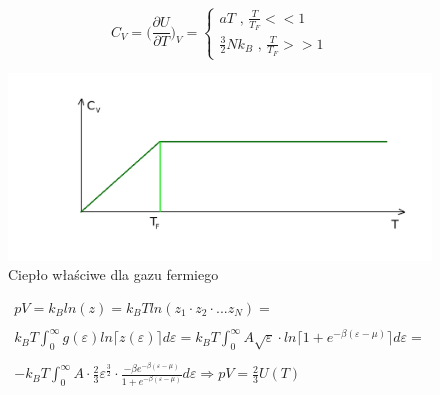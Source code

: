 \documentclass{article}
\begin{document}
		\begin{equation}
		C_V = \bigg( \frac{\partial U}{\partial T} \bigg)_V = 
		\begin{cases}
			aT \text{ , } \frac{T}{T_F} << 1 \\
			\frac{3}{2}Nk_B \text{ , } \frac{T}{T_F} >> 1
		\end{cases}
		\end{equation}
		\begin{figure}[ht]
			\label{fig:fig1}
			\centering
			\includegraphics[scale=0.5]{cieplo_wlasciwe_gaz_fermiego.jpeg}
			\caption{Ciepło właściwe dla gazu fermiego}
		\end{figure}
		\begin{equation}
		\begin{array}{cc}
		pV = 
		k_Bln(z) = 
		k_BTln(z_1 \cdot z_2 \cdot ... z_N) = \\ \\ 
		k_BT\int_{0}^{\infty}g(\varepsilon)ln \lceil z(\varepsilon) \rceil d \varepsilon = 
		k_BT\int_{0}^{\infty} A \sqrt{\varepsilon} \cdot ln \lceil 1 + e^{-\beta(\varepsilon - \mu)} \rceil d \varepsilon = \\ \\
		-k_B T \int_{0}^{\infty} A \cdot \frac{2}{3} \varepsilon^{\frac{3}{2}} \cdot 
		\frac{- \beta e^{-\beta(\varepsilon - \mu)}}{1 + e^{-\beta(\varepsilon - \mu)}} d\varepsilon
		\Rightarrow pV = \frac{2}{3}U(T)
		\end{array}
		\end{equation}
\end{document}
